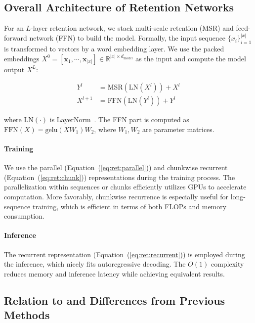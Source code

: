 \subsection{Overall Architecture of Retention Networks}
\label{sec:arch}

For an $L$-layer retention network, we stack multi-scale retention (MSR) and feed-forward network (FFN) to build the model. Formally, the input sequence $\{x_i\}_{i=1}^{|x|}$ is transformed to vectors by a word embedding layer. We use the packed embeddings $X^0 = [{\bm{x}}_1, \cdots, {\bm{x}}_{|x|}] \in \mathbb{R}^{|x|\times d_\text{model}}$ as the input and compute the model output $X^L$:

\begin{equation}
\begin{aligned}
\label{eq:arch}
Y^l &= \mathrm{MSR}(\mathrm{LN}(X^l)) + X^l \\
X^{l+1} &= \mathrm{FFN}(\mathrm{LN}(Y^l)) + Y^l
\end{aligned}
\end{equation}

where $\mathrm{LN}(\cdot)$ is LayerNorm~\cite{layernorm}. The FFN part is computed as $\mathrm{FFN}(X) = \mathrm{gelu}(X W_1) W_2$, where $W_1, W_2$ are parameter matrices.

\paragraph{Training}
We use the parallel (Equation~(\ref{eq:ret:parallel})) and chunkwise recurrent 
(Equation~(\ref{eq:ret:chunk})) representations during the training process. The parallelization within sequences or chunks efficiently utilizes GPUs to accelerate computation. More favorably, chunkwise recurrence is especially useful for long-sequence training, which is efficient in terms of both FLOPs and memory consumption.

\paragraph{Inference}
The recurrent representation (Equation~(\ref{eq:ret:recurrent})) is employed during the inference, which nicely fits autoregressive decoding. The $O(1)$ complexity reduces memory and inference latency while achieving equivalent results.

\subsection{Relation to and Differences from Previous Methods}

